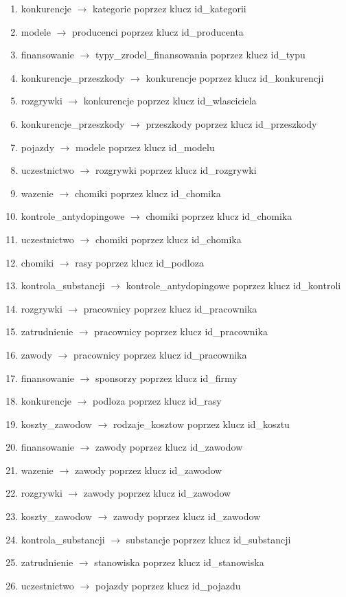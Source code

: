 \documentclass{article}
\begin{document}
\begin{enumerate}
    \item konkurencje $\longrightarrow$ kategorie poprzez klucz id\_kategorii
    \item modele $\longrightarrow$ producenci poprzez klucz id\_producenta
    \item finansowanie $\longrightarrow$ typy\_zrodel\_finansowania poprzez klucz id\_typu
    \item konkurencje\_przeszkody $\longrightarrow$ konkurencje poprzez klucz id\_konkurencji
    \item rozgrywki $\longrightarrow$ konkurencje poprzez klucz id\_wlasciciela
    \item konkurencje\_przeszkody $\longrightarrow$ przeszkody poprzez klucz id\_przeszkody
    \item pojazdy $\longrightarrow$ modele poprzez klucz id\_modelu
    \item uczestnictwo $\longrightarrow$ rozgrywki poprzez klucz id\_rozgrywki
    \item wazenie $\longrightarrow$ chomiki poprzez klucz id\_chomika
    \item kontrole\_antydopingowe $\longrightarrow$ chomiki poprzez klucz id\_chomika
    \item uczestnictwo $\longrightarrow$ chomiki poprzez klucz id\_chomika
    \item chomiki $\longrightarrow$ rasy poprzez klucz id\_podloza
    \item kontrola\_substancji  $\longrightarrow$ kontrole\_antydopingowe poprzez klucz id\_kontroli
    \item rozgrywki $\longrightarrow$ pracownicy poprzez klucz id\_pracownika
    \item zatrudnienie $\longrightarrow$ pracownicy poprzez klucz id\_pracownika
    \item zawody $\longrightarrow$ pracownicy poprzez klucz id\_pracownika
    \item finansowanie $\longrightarrow$ sponsorzy poprzez klucz id\_firmy
    \item konkurencje $\longrightarrow$ podloza poprzez klucz id\_rasy
    \item koszty\_zawodow $\longrightarrow$ rodzaje\_kosztow poprzez klucz id\_kosztu
    \item finansowanie $\longrightarrow$ zawody poprzez klucz id\_zawodow
    \item wazenie $\longrightarrow$ zawody poprzez klucz id\_zawodow
    \item rozgrywki $\longrightarrow$ zawody poprzez klucz id\_zawodow
    \item koszty\_zawodow $\longrightarrow$ zawody poprzez klucz id\_zawodow
    \item kontrola\_substancji $\longrightarrow$ substancje poprzez klucz id\_substancji
    \item zatrudnienie $\longrightarrow$ stanowiska poprzez klucz id\_stanowiska
    \item uczestnictwo $\longrightarrow$ pojazdy poprzez klucz id\_pojazdu
\end{enumerate}
\end{document}
